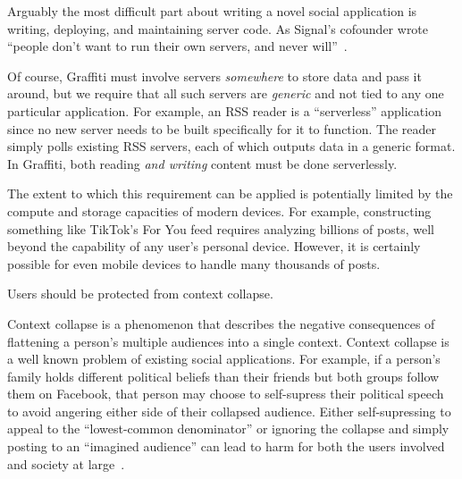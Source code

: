 Arguably the most difficult part about writing a novel
social application is writing, deploying,
and maintaining server code.
As Signal's cofounder wrote
``people don’t want to run their own servers, and never will''~\cite{moxieweb3}.

Of course, Graffiti must involve servers \emph{somewhere} to store data
and pass it around, but we require that all such servers are \emph{generic}
and not tied to any one particular application.
For example, an RSS reader is a ``serverless'' application since
no new server needs to be built specifically for it to function.
The reader simply polls existing RSS servers, each of which outputs data in a generic format.
In Graffiti, both reading \emph{and writing} content must be done serverlessly.

The extent to which this requirement can be applied is potentially limited
by the compute and storage capacities of modern devices.
For example, constructing something like TikTok's For You feed requires
analyzing billions of posts, well beyond the capability of any user's personal device.
However, it is certainly possible for even mobile devices to handle many thousands of posts.


\begin{requirement}
\label{requirements:context-differentiation}
    Users should be protected from context collapse.
\end{requirement}

Context collapse is a phenomenon that describes the negative consequences of flattening
a person's multiple audiences into a single context.
Context collapse is a well known problem of existing social applications.
For example, if a person's family holds different political beliefs than their friends
but both groups follow them on Facebook, that person may choose to self-supress their political
speech to avoid angering either side of their collapsed audience.
Either self-supressing to appeal to the ``lowest-common denominator'' or ignoring the collapse
and simply posting to an ``imagined audience'' can lead to harm for both
the users involved and society at large~\cite{contextcollapse, contextcollapseimpact, contextcollapsequeer, spiralofsilencesocialmedia}.

